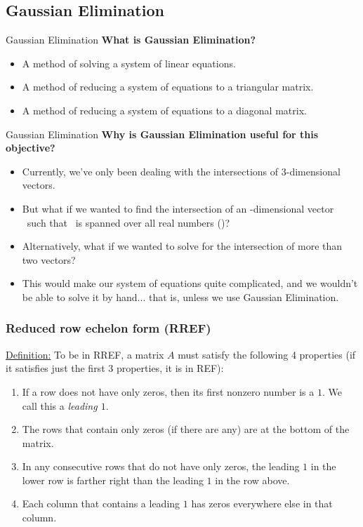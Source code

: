 \subsection{Gaussian Elimination}
\frame{\subsectionpage}
\begin{frame}{Gaussian Elimination}
    \textbf{What is Gaussian Elimination?}
    \begin{itemize}
        \item<2->{A method of solving a system of linear equations.}
        \item<3->{A method of reducing a system of equations to a triangular matrix.}
        \item<4->{A method of reducing a system of equations to a diagonal matrix.}
    \end{itemize}
\end{frame}
\begin{frame}{Gaussian Elimination}
    \textbf{Why is Gaussian Elimination useful for this objective?}
    \begin{itemize}
        \item<2->{Currently, we've only been dealing with the intersections of 3-dimensional vectors.}
        \item<3->{But what if we wanted to find the intersection of an \begingroup{}\endgroup -dimensional vector \begingroup{}\endgroup \ such that \begingroup{} \endgroup \ is spanned over all real numbers (\begingroup{}\endgroup )?}
        \item<4->{Alternatively, what if we wanted to solve for the intersection of more than two vectors?}
        \item<5->{This would make our system of equations quite complicated, and we wouldn't be able to solve it by hand... that is, unless we use Gaussian Elimination.}
    \end{itemize}
\end{frame}
\begin{frame}
    \frametitle{Reduced row echelon form (RREF)}
    \underline{Definition:} To be in RREF, a matrix $A$ must satisfy the following 4 properties (if it satisfies just the first 3 properties, it is in REF):
    \begin{enumerate}[1.]
        \item<2->{If a row does not have only zeros, then its first nonzero number is a $1$. We call this a {\em leading $1$}.}
        \item<3->{The rows that contain only zeros (if there are any) are at the bottom of the matrix.}
        \item<4->{In any consecutive rows that do not have only zeros, the leading $1$ in the lower row is farther right than the leading $1$ in the row above.}
        \item<5->{Each column that contains a leading $1$ has zeros everywhere else in that column.}
    \end{enumerate}
\end{frame}
